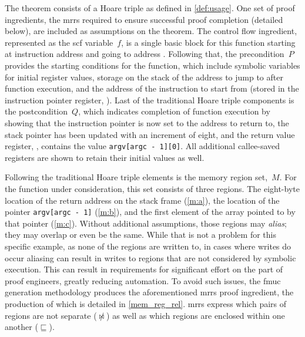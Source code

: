 The theorem consists of a Hoare triple as defined in \cref{def:usage}.%
One set of proof ingredients,
the \acp{mrr} required to ensure successful proof completion (detailed below),
are included as assumptions on the theorem.
The control flow ingredient,
represented as the \ac{scf} variable~$f$, is a single basic block for this function
starting at instruction address  and going to address .
Following that,
the precondition~$P$ provides the starting conditions for the function,%
which include symbolic variables for initial register values,
storage on the stack of the address to jump to after function execution,
and the address of the instruction to start from
(stored in the instruction pointer register, ).
Last of the traditional Hoare triple components is the postcondition~$Q$,%
which indicates completion of function execution
by showing that the instruction pointer is now set to the address to return to,
the stack pointer  has been updated with an increment of eight,
and the return value register, ,
contains the value \lstinline|argv[argc - 1][0]|.
All additional callee-saved registers are shown to retain their initial values%
as well.

Following the traditional Hoare triple elements is the memory region set,~$M$.%
For the function under consideration, this set consists of three regions.
The eight-byte location of the return address
on the stack frame (\cref{m:a}),
the location of the pointer \lstinline|argv[argc - 1]| (\cref{m:b}),
and the first element of the array pointed to by that pointer (\cref{m:c}).
Without additional assumptions, those regions may \emph{alias};%
they may overlap or even be the same.
While that is not a problem for this specific example,
as none of the regions are written to, in cases where writes do occur
aliasing can result in writes to regions
that are not considered by symbolic execution.
This can result in requirements for significant effort on the part of proof engineers,
greatly reducing automation.
To avoid such issues, the \ac{fmuc} generation methodology
produces the aforementioned \acp{mrr} proof ingredient,%
the production of which is detailed in \cref{mem_reg_rel}.
\Acp{mrr} express which pairs of regions are not separate ($\not\bowtie$)%
as well as which regions are enclosed within one another ($\sqsubseteq$).%

